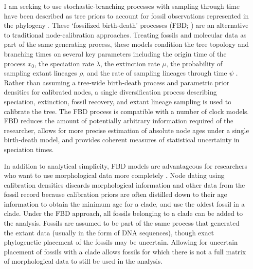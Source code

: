 \documentclass[]{article}
\begin{document}
I am seeking to use stochastic-branching processes with sampling through time have been described as tree priors to account for fossil observations represented in the phylogeny \citep{Heath22072014, Stadler2010396,  Didier201226,gavryushkina2015bayesian}. These ‘fossilized birth-death’ processes (FBD; \citep{Heath22072014}) are an alternative to traditional node-calibration approaches. Treating fossils and molecular data as part of the same generating process, these models condition the tree topology and branching times on several key parameters including the origin time of the process $x_0$, the speciation rate $\lambda$, the extinction rate $\mu$, the probability of sampling extant lineages $\rho$, and the rate of sampling lineages through time $\psi$ \citep{Heath22072014, Stadler2010396}. Rather than assuming a tree-wide birth-death process and parametric prior densities for calibrated nodes, a single diversification process describing speciation, extinction, fossil recovery, and extant lineage sampling is used to calibrate the tree. The FBD process is compatible with a number of clock models. FBD reduces the amount of potentially arbitrary information required of the researcher, allows for more precise estimation of absolute node ages under a single birth-death model, and provides coherent measures of statistical uncertainty in speciation times.\par
In addition to analytical simplicity, FBD models are advantageous for researchers who want to use morphological data more completely \citep{gavryushkina2015bayesian}. Node dating using calibration densities discards morphological information and other data from the fossil record because calibration priors are often distilled down to their age information to obtain the minimum age for a clade, and use the oldest fossil in a clade. Under the FBD approach, all fossils belonging to a clade can be added to the analysis. Fossils are assumed to be part of the same process that generated the extant data (usually in the form of DNA sequences), though exact phylogenetic placement of the fossils may be uncertain. Allowing for uncertain placement of fossils with a clade allows fossils for which there is not a full matrix of morphological data to still be used in the analysis. \par    
\end{document}
